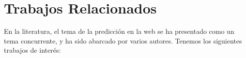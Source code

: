 















\section{Trabajos Relacionados}

En la literatura, el tema de la predicción en la web se ha presentado como un tema concurrente, y ha sido abarcado por 
varios autores. Tenemos los siguientes trabajos de interés:




